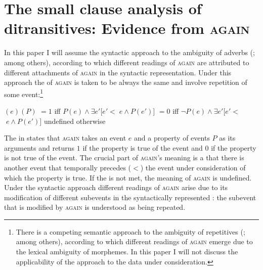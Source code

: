 \documentclass[output=paper]{langscibook}
\begin{document}
\section{The small clause analysis of ditransitives: Evidence from \textsc{again}}\label{s2}

In this paper I will assume the syntactic approach to the ambiguity of  adverbs (\citealt{vonStechow1996,Beck-Johnson2004,Beck2005,Alexiadou-etal2014,Lechner-etal2015}; among others), according to which different readings of \textsc{again} are attributed to different attachments of \textsc{again} in the syntactic representation. Under this approach the  of \textsc{again} is taken to be always the same and involve repetition of some event:\footnote{There is a competing semantic approach to the ambiguity of repetitives (\citealt{FabriciusHansen2001,Jäger-Blutner2000}; among others), according to which different readings of \textsc{again} emerge due to the lexical ambiguity of  morphemes. In this paper I will not discuss the applicability of the  approach to the data under consideration.}


 \ea\label{ex:bondarenko:8}
$(e)(P)$
\ea $=  1$ iff          $P(e) \wedge \exists e' [e'<$$\;e\wedge P(e')]$
\ex $= 0$ iff $\neg P(e)\wedge {\exists} e'[e'<$$\;e\wedge P(e')]$
\ex undefined otherwise
\z\z


\noindent The  in  states that \textsc{again} takes an event $e$ and a property of events $P$ as its arguments and returns $1$ if the property is true of the event and $0$ if the property is not true of the event. The crucial part of \textsc{again}’s meaning is a  that there is another event that temporally precedes ($<$) the event under consideration of which the property is true. If the  is not met, the meaning of \textsc{again} is undefined. Under the syntactic approach different readings of \textsc{again} arise due to its modification of different subevents in the syntactically represented : the subevent that is modified by \textsc{again} is understood as being repeated.
\end{document}
